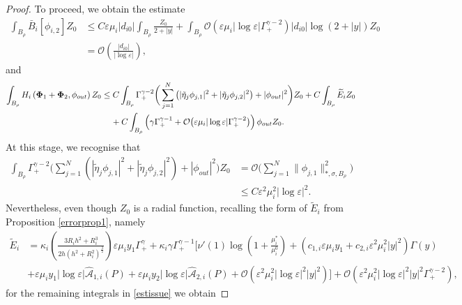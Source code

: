 \documentclass[11pt,reqno,a4paper]{amsart}
\numberwithin{equation}{section}
\newcommand{\ve}{\varepsilon}
\begin{document}
\begin{proof}
To proceed, we obtain the estimate 
\begin{equation}\label{estimateBphi2Zo}
\begin{aligned}
\int_{B_{\rho}}\bar{B}_i[\phi_{i,2}]Z_0 
&\leq C\ve\mu_i  |d_{i0}|\int_{B_{\rho}}\frac{Z_0}{2+|y|}+ \int_{B_{\rho}}\mathcal{O}\left(\ve\mu_i|\log\ve|\Gamma^{\gamma-2}_{+}\right)|d_{i0}|\log(2+|y|) Z_0\\
&=\mathcal{O}\left(\frac{|d_{i0}|}{|\log\ve|}\right),
\end{aligned}
\end{equation}
and 
\begin{equation}\label{estissue}
\begin{aligned}
\int_{B_{\rho}}H_i\left(\mathbf{\Phi}_1+\mathbf{\Phi}_2,\phi_{out}\right)Z_0 &\leq C\int_{B_{\rho}}\Gamma^{\gamma-2}_{+}\bigg(\sum_{j=1}^{N}\big(|\tilde{\eta}_j\phi_{j,1}|^2+|\tilde{\eta}_j\phi_{j,2}|^2\big)+|\phi_{out}|^2\bigg)Z_0 +C\int_{B_{\rho}} \widetilde{E}_iZ_0\\
&\hspace{4mm}+C\int_{B_{\rho}}\left(\gamma\Gamma^{\gamma-1}_{+}+\mathcal{O}\big(\ve\mu_i|\log\ve|\Gamma^{\gamma-2}_{+}\big)\right)\phi_{out}Z_0.
\end{aligned}
\end{equation}
At this stage, we recognise that
\begin{equation}\label{estquad}
\begin{aligned}
\int_{B_{\rho}}\Gamma^{\gamma-2}_{+}\bigg(\sum_{j=1}^{N}\left(|\tilde{\eta}_j\phi_{j,1}|^2+|\tilde{\eta}_j\phi_{j,2}|^2\right)+|\phi_{out}|^2\bigg)Z_0&=\mathcal{O}\bigg(\sum_{j=1}^{N}\|\phi_{j,1}\|^2_{*,\sigma,B_{\rho}}\bigg)\\
&\leq C \ve^2\mu_i^2|\log\ve|^2.
\end{aligned}
\end{equation}
Nevertheless, even though $Z_0$ is a radial function, recalling the form of $\widetilde{E}_i$ from Proposition \ref{errorprop1}, namely 
\begin{align*}
\widetilde{E}_i&= \kappa_i\left(\frac{3R_ih^2+R_i^3}{2h\left(h^2+R_i^2\right)^{\frac3 2}}\right)\ve\mu_i y_1\Gamma^{\gamma}_{+} +\kappa_i\gamma\Gamma^{\gamma-1}_{+}\Bigg[\nu'(1)\log\left(1+\frac{\mu^{*}_i}{\mu^{0}_i}\right)+\left(c_{1,i}\ve\mu_iy_1+c_{2,i}\ve^2\mu_i^2|y|^2\right)\Gamma(y)\\
   &+\ve\mu_i y_1|\log\ve|\widehat{\mathcal{A}}_{1,i}(P)+\ve\mu_i y_2|\log\ve|\widehat{\mathcal{A}}_{2,i}(P)+\mathcal{O}\left(\ve^2\mu_i^2|\log\ve|^2 |y|^2\right)\Bigg]+\mathcal{O}\left(\ve^2\mu_i^2|\log\ve|^2|y|^2\Gamma^{\gamma-2}_{+}\right),
    \end{align*}
for the remaining integrals in \eqref{estissue} we obtain 


\end{proof}
\end{document}
